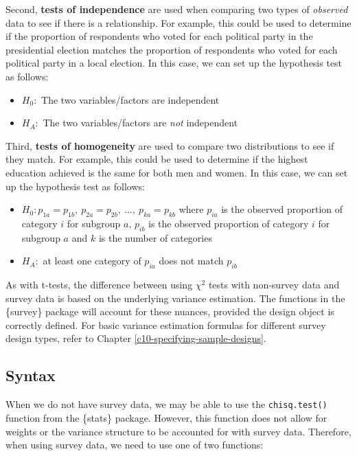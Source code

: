 \documentclass[
]{krantz}
\providecommand{\tightlist}{%
  \setlength{\itemsep}{0pt}\setlength{\parskip}{0pt}}
\begin{document}
Second, \textbf{tests of independence} are used when comparing two types of \emph{observed} data to see if there is a relationship. For example, this could be used to determine if the proportion of respondents who voted for each political party in the presidential election matches the proportion of respondents who voted for each political party in a local election. In this case, we can set up the hypothesis test as follows:

\begin{itemize}
\tightlist
\item
  \(H_0:\) The two variables/factors are independent
\item
  \(H_A:\) The two variables/factors are \emph{not} independent
\end{itemize}

Third, \textbf{tests of homogeneity} are used to compare two distributions to see if they match. For example, this could be used to determine if the highest education achieved is the same for both men and women. In this case, we can set up the hypothesis test as follows:

\begin{itemize}
\tightlist
\item
  \(H_0: p_{1a} = p_{1b}, ~ p_{2a} = p_{2b}, ~ ..., ~ p_{ka} = p_{kb}\) where \(p_{ia}\) is the observed proportion of category \(i\) for subgroup \(a\), \(p_{ib}\) is the observed proportion of category \(i\) for subgroup \(a\) and \(k\) is the number of categories
\item
  \(H_A:\) at least one category of \(p_{ia}\) does not match \(p_{ib}\)
\end{itemize}

As with t-tests, the difference between using \(\chi^2\) tests with non-survey data and survey data is based on the underlying variance estimation. The functions in the \{survey\} package will account for these nuances, provided the design object is correctly defined. For basic variance estimation formulas for different survey design types, refer to Chapter \ref{c10-specifying-sample-designs}.

\hypertarget{stattest-chi-syntax}{%
\subsection{Syntax}\label{stattest-chi-syntax}}

When we do not have survey data, we may be able to use the \texttt{chisq.test()} function from the \{stats\} package. However, this function does not allow for weights or the variance structure to be accounted for with survey data. Therefore, when using survey data, we need to use one of two functions:
\end{document}
